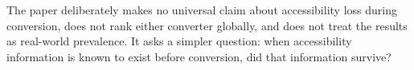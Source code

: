 The paper deliberately makes no universal claim about accessibility loss during conversion, does not rank either converter globally, and does not treat the results as real-world prevalence. It asks a simpler question: when accessibility information is known to exist before conversion, did that information survive?


